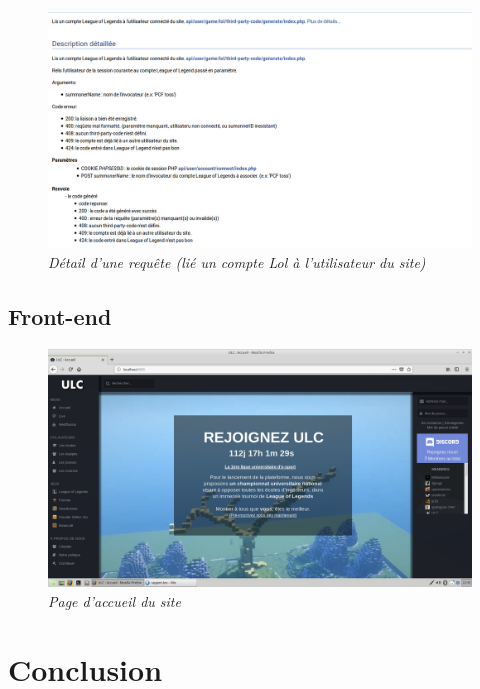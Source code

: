 \documentclass[10pt]{article}
\begin{document}
      \begin{figure}[H]
	\begin{center}
	  \includegraphics[width=14cm,keepaspectratio]{./images/link_account.png}
	\end{center}
	\caption{\textit{Détail d'une requête (lié un compte Lol à l'utilisateur du site)}}
	\label{link_account}
      \end{figure}

    \subsection{Front-end}
      \begin{figure}[H]
	\begin{center}
	  \includegraphics[width=16cm,keepaspectratio]{./images/site.png}
	\end{center}
	\caption{\textit{Page d'accueil du site}}
	\label{uml}
      \end{figure}
  
  \newpage
  \section{Conclusion}
  \newpage
\end{document}

